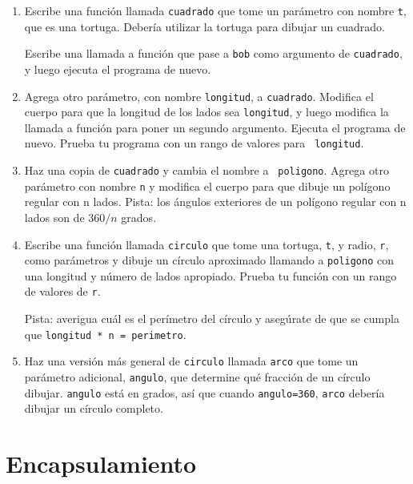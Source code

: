 \documentclass[10pt]{book}
\begin{document}
\begin{enumerate}

\item Escribe una función llamada {\tt cuadrado} que tome un parámetro
con nombre {\tt t}, que es una tortuga.  Debería utilizar la tortuga para dibujar
un cuadrado.

Escribe una llamada a función que pase a {\tt bob} como argumento de 
{\tt cuadrado}, y luego ejecuta el programa de nuevo.

\item Agrega otro parámetro, con nombre {\tt longitud}, a {\tt cuadrado}.
Modifica el cuerpo para que la longitud de los lados sea {\tt longitud}, y luego
modifica la llamada a función para poner un segundo argumento.  Ejecuta el
programa de nuevo.  Prueba tu programa con un rango de valores para {\tt
longitud}.

\item Haz una copia de {\tt cuadrado} y cambia el nombre a {\tt
  poligono}.  Agrega otro parámetro con nombre {\tt n} y modifica el cuerpo
  para que dibuje un polígono regular con n lados.  Pista: los ángulos exteriores
  de un polígono regular con n lados son de $360/n$ grados.  

\item Escribe una función llamada {\tt circulo} que tome una tortuga,
{\tt t}, y radio, {\tt r}, como parámetros y dibuje un círculo
aproximado llamando a {\tt poligono} con una longitud y
número de lados apropiado.  Prueba tu función con un rango de valores
de {\tt r}.   

Pista: averigua cuál es el perímetro del círculo y asegúrate de que
se cumpla que {\tt longitud * n = perimetro}.

\item Haz una versión más general de {\tt circulo} llamada {\tt arco}
que tome un parámetro adicional, {\tt angulo}, que determine
qué fracción de un círculo dibujar.  {\tt angulo} está en
grados, así que cuando {\tt angulo=360}, {\tt arco} debería dibujar un círculo
completo.

\end{enumerate}


\section{Encapsulamiento}
\end{document}
